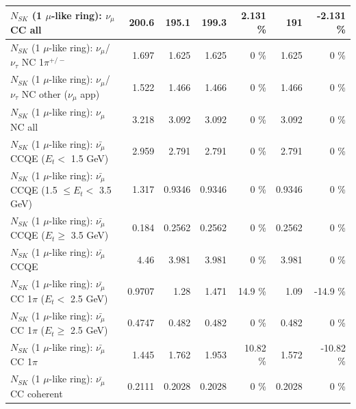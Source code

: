 \begin{table}
\begin{tabular}{| l | r | r | r  r | r  r |}
                                $N_{SK}$ (1 $\mu$-like ring): $\nu_{\mu}$ CC all &           200.6 &           195.1 &           199.3 &    2.131 \%  &             191 &   -2.131 \%  \\ 
\hline
              $N_{SK}$ (1 $\mu$-like ring): $\nu_\mu$/$\nu_\tau$ NC 1$\pi^{+/-}$ &           1.697 &           1.625 &           1.625 &        0 \%  &           1.625 &        0 \%  \\ 
     $N_{SK}$ (1 $\mu$-like ring): $\nu_\mu$/$\nu_\tau$ NC other ($\nu_\mu$ app) &           1.522 &           1.466 &           1.466 &        0 \%  &           1.466 &        0 \%  \\ 
                                $N_{SK}$ (1 $\mu$-like ring): $\nu_{\mu}$ NC all &           3.218 &           3.092 &           3.092 &        0 \%  &           3.092 &        0 \%  \\ 
\hline
\hline
\hline
          $N_{SK}$ (1 $\mu$-like ring): $\bar{\nu_\mu}$ CCQE ($E_{t} <$ 1.5 GeV) &           2.959 &           2.791 &           2.791 &        0 \%  &           2.791 &        0 \%  \\ 
 $N_{SK}$ (1 $\mu$-like ring): $\bar{\nu_\mu}$ CCQE (1.5 $\leq E_{t} <$ 3.5 GeV) &           1.317 &          0.9346 &          0.9346 &        0 \%  &          0.9346 &        0 \%  \\ 
       $N_{SK}$ (1 $\mu$-like ring): $\bar{\nu_\mu}$ CCQE ($E_{t} \geq$ 3.5 GeV) &           0.184 &          0.2562 &          0.2562 &        0 \%  &          0.2562 &        0 \%  \\ 
\hline
                              $N_{SK}$ (1 $\mu$-like ring): $\bar{\nu_\mu}$ CCQE &            4.46 &           3.981 &           3.981 &        0 \%  &           3.981 &        0 \%  \\ 
\hline
     $N_{SK}$ (1 $\mu$-like ring): $\bar{\nu_\mu}$ CC 1$\pi$ ($E_{t} <$ 2.5 GeV) &          0.9707 &            1.28 &           1.471 &     14.9 \%  &            1.09 &    -14.9 \%  \\ 
  $N_{SK}$ (1 $\mu$-like ring): $\bar{\nu_\mu}$ CC 1$\pi$ ($E_{t} \geq$ 2.5 GeV) &          0.4747 &           0.482 &           0.482 &        0 \%  &           0.482 &        0 \%  \\ 
\hline
                         $N_{SK}$ (1 $\mu$-like ring): $\bar{\nu_\mu}$ CC 1$\pi$ &           1.445 &           1.762 &           1.953 &    10.82 \%  &           1.572 &   -10.82 \%  \\ 
                       $N_{SK}$ (1 $\mu$-like ring): $\bar{\nu_\mu}$ CC coherent &          0.2111 &          0.2028 &          0.2028 &        0 \%  &          0.2028 &        0 \%  \\ 

\end{tabular}
\end{table}
